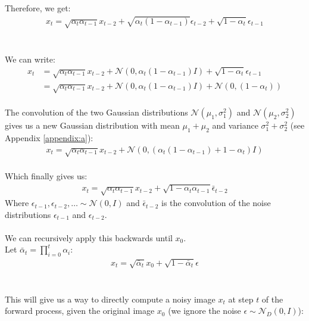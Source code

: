 \documentclass[twoside]{article}
\numberwithin{equation}{section}
\numberwithin{figure}{section}
\begin{document}
\\\\
Therefore, we get:
\begin{gather*}
  x_t = \sqrt{\alpha_t \alpha_{t-1}} x_{t-2} + \sqrt{\alpha_t\left(1 - \alpha_{t-1}\right)} \epsilon_{t - 2} + \sqrt{1 - \alpha_t} \epsilon_{t - 1}
\end{gather*}
\\\\
We can write:
\begin{align}
  x_t &= \sqrt{\alpha_t \alpha_{t-1}} x_{t-2} + \mathcal{N}\left(0, \alpha_t\left(1 - \alpha_{t-1}\right)I \right) + \sqrt{1 - \alpha_t} \epsilon_{t - 1} \\
&= \sqrt{\alpha_t \alpha_{t-1}} x_{t-2} + \mathcal{N}\left(0, \alpha_t\left(1 - \alpha_{t-1}\right)I\right) + \mathcal{N}\left(0, (1 - \alpha_t) \right) \label{eq:convolution}
\end{align}
\\
The convolution of the two Gaussian distributions $\mathcal{N}(\mu_1, \sigma_1^2)$ and $\mathcal{N}(\mu_2, \sigma_2^2)$ gives us a new Gaussian distribution with mean $\mu_1 + \mu_2$ and variance $\sigma_1^2 + \sigma_2^2$ (see Appendix \ref{appendix:a}):
\begin{align}
  x_t = \sqrt{\alpha_t \alpha_{t-1}} x_{t-2} + \mathcal{N}\left(0, \left(\alpha_t\left(1 - \alpha_{t-1}\right) + 1 - \alpha_t\right)I\right)
\end{align}
\\
Which finally gives us:
\begin{gather*}
  x_t = \sqrt{\alpha_t \alpha_{t-1}} x_{t-2} + \sqrt{1 - \alpha_t \alpha_{t-1}} \bar{\epsilon}_{t - 2}
\end{gather*}
Where $\epsilon_{t - 1}, \epsilon_{t - 2}, \ldots \sim \mathcal{N}\left(0, I\right)$ and $\bar{\epsilon}_{t - 2}$ is the convolution of the noise distributions $\epsilon_{t - 1}$ and $\epsilon_{t - 2}$.
\\\\
We can recursively apply this backwards until $x_0$. \\
Let $\bar{\alpha}_t = \prod_{i=0}^{t}{\alpha_i}$:
\begin{gather}
  x_t = \sqrt{\bar{\alpha}_t} x_0 + \sqrt{1 - \bar{\alpha}_t} \epsilon
\end{gather}
\\\\
This will give us a way to directly compute a noisy image $x_t$ at step $t$ of the forward process, given the original image $x_0$ (we ignore the noise $\epsilon \sim \mathcal{N}_D\left(0, I\right)$):
\end{document}
